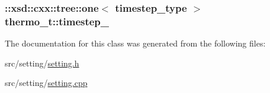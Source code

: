 \subsubsection[{\texorpdfstring{timestep\+\_\+}{timestep_}}]{\setlength{\rightskip}{0pt plus 5cm}\+::xsd\+::cxx\+::tree\+::one$<$ {\bf timestep\+\_\+type} $>$ thermo\+\_\+t\+::timestep\+\_\+\hspace{0.3cm}{\ttfamily [protected]}}\hypertarget{classthermo__t_a81482a5b9787aef0293b763d929cfc31}{}\label{classthermo__t_a81482a5b9787aef0293b763d929cfc31}


The documentation for this class was generated from the following files\+:\begin{DoxyCompactItemize}
\item 
src/setting/\hyperlink{setting_8h}{setting.\+h}\item 
src/setting/\hyperlink{setting_8cpp}{setting.\+cpp}\end{DoxyCompactItemize}

